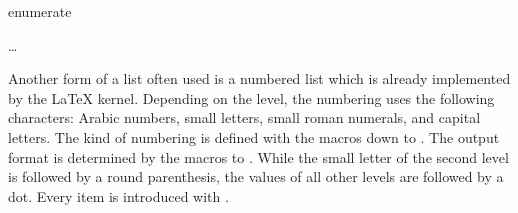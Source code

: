 \begin{Declaration}
  \begin{Environment}{enumerate}
    \begin{Body}
       \dots
      \BodyDots
    \end{Body}
  \end{Environment}
\end{Declaration}%
Another form of a list often used is a numbered list which is already
implemented by the {\LaTeX} kernel. Depending on the level, the
numbering uses the following characters: Arabic numbers,
small letters, small roman numerals, and capital letters. The kind of numbering
is defined with the macros  down to . The
output format is determined by the macros  to
. While the small letter of the second level is followed by
a round parenthesis, the values of all other levels are followed by a
dot. Every item is introduced with .%
\ifCommonmaincls
